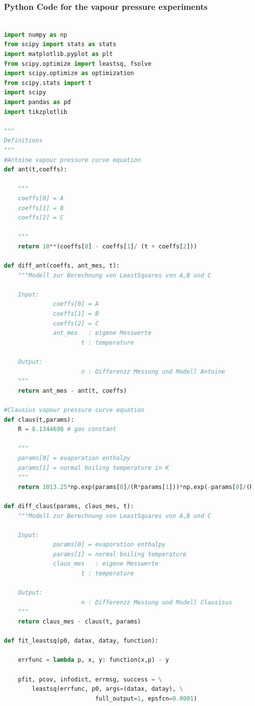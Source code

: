 \documentclass[a4paper,abstracton]{article}	                       %
\begin{document}
\subsubsection*{Python Code for the vapour pressure experiments}
\begin{lstlisting}[language=Python]

import numpy as np
from scipy import stats as stats
import matplotlib.pyplot as plt
from scipy.optimize import leastsq, fsolve
import scipy.optimize as optimization
from scipy.stats import t
import scipy
import pandas as pd
import tikzplotlib

"""
Definitions
"""
#Antoine vapour pressure curve equation 
def ant(t,coeffs):
    
    """
    coeffs[0] = A
    coeffs[1] = B
    coeffs[2] = C
    
    """
    return 10**(coeffs[0] - coeffs[1]/ (t + coeffs[2]))

def diff_ant(coeffs, ant_mes, t):
    """Modell zur Berechnung von LeastSquares von A,B und C

    Input:
              coeffs[0] = A
              coeffs[1] = B
              coeffs[2] = C
              ant_mes   : eigene Messwerte 
                      t : temperature

    Output:
                      n : Differenzz Messung und Modell Antoine
    """
    return ant_mes - ant(t, coeffs)

#Clausius vapour pressure curve equation
def claus(t,params):
    R = 8.1344698 # gas constant
    
    """
    params[0] = evaporation enthalpy 
    params[1] = normal boiling temperature in K
    """
    return 1013.25*np.exp(params[0]/(R*params[1]))*np.exp(-params[0]/(R*(t+273.15)))

def diff_claus(params, claus_mes, t):
    """Modell zur Berechnung von LeastSquares von A,B und C

    Input:
              params[0] = evaporation enthalpy
              params[1] = normal boiling temperature
              claus_mes   : eigene Messwerte 
                      t : temperature

    Output:
                      n : Differenzz Messung und Modell Clausisus
    """
    return claus_mes - claus(t, params)

def fit_leastsq(p0, datax, datay, function):

    errfunc = lambda p, x, y: function(x,p) - y

    pfit, pcov, infodict, errmsg, success = \
        leastsq(errfunc, p0, args=(datax, datay), \
                          full_output=1, epsfcn=0.0001)


\end{lstlisting}
\end{document}
